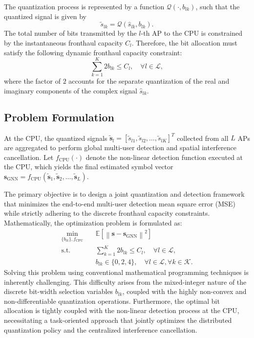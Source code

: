 The quantization process is represented by a function $\mathcal{Q}(\cdot, b_{lk})$, such that the quantized signal is given by
\begin{equation}
    \tilde{s}_{lk} = \mathcal{Q}(\hat{s}_{lk}, b_{lk}).
\end{equation}
The total number of bits transmitted by the $l$-th AP to the CPU is constrained by the instantaneous fronthaul capacity $C_l$. Therefore, the bit allocation must satisfy the following dynamic fronthaul capacity constraint:
\begin{equation}
    \sum_{k=1}^{K} 2 b_{lk} \leq C_l, \quad \forall l \in \mathcal{L},
\end{equation}
where the factor of $2$ accounts for the separate quantization of the real and imaginary components of the complex signal $\hat{s}_{lk}$.

\subsection{Problem Formulation}
At the CPU, the quantized signals $\tilde{\mathbf{s}}_l = [\tilde{s}_{l1}, \tilde{s}_{l2}, \dots, \tilde{s}_{lK}]^T$ collected from all $L$ APs are aggregated to perform global multi-user detection and spatial interference cancellation. Let $f_{\text{CPU}}(\cdot)$ denote the non-linear detection function executed at the CPU, which yields the final estimated symbol vector $\mathbf{s}_{\text{GNN}} = f_{\text{CPU}}(\tilde{\mathbf{s}}_1, \tilde{\mathbf{s}}_2, \dots, \tilde{\mathbf{s}}_L)$. 

The primary objective is to design a joint quantization and detection framework that minimizes the end-to-end multi-user detection mean square error (MSE) while strictly adhering to the discrete fronthaul capacity constraints. Mathematically, the optimization problem is formulated as:
\begin{subequations}
\begin{align}
    \min_{\{b_{lk}\}, f_{\text{CPU}}} \quad & \mathbb{E} \left[ \left\| \mathbf{s} - \mathbf{s}_{\text{GNN}} \right\|^2 \right] \\
    \text{s.t.} \quad & \sum_{k=1}^{K} 2 b_{lk} \leq C_l, \quad \forall l \in \mathcal{L}, \\
    & b_{lk} \in \{0, 2, 4\}, \quad \forall l \in \mathcal{L}, \forall k \in \mathcal{K}.
\end{align}
\end{subequations}
Solving this problem using conventional mathematical programming techniques is inherently challenging. This difficulty arises from the mixed-integer nature of the discrete bit-width selection variables $b_{lk}$, coupled with the highly non-convex and non-differentiable quantization operations. Furthermore, the optimal bit allocation is tightly coupled with the non-linear detection process at the CPU, necessitating a task-oriented approach that jointly optimizes the distributed quantization policy and the centralized interference cancellation.